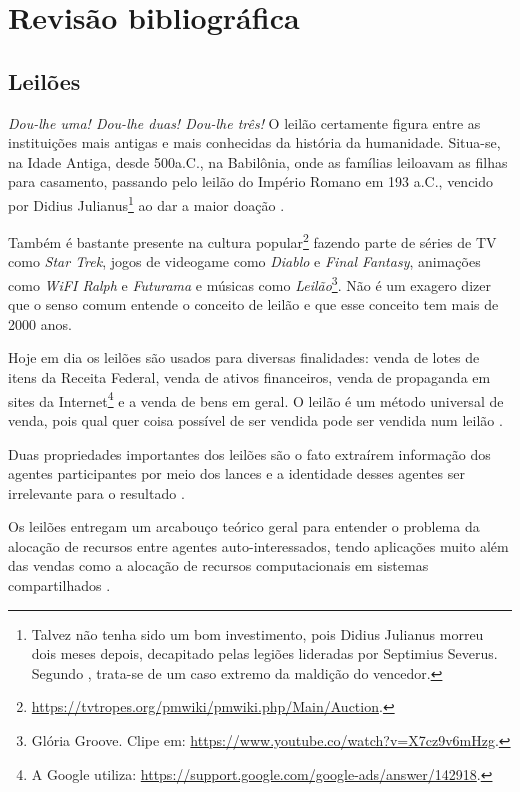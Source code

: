\chapter{Revisão bibliográfica}
\label{cap:revisao}

\section{Leilões}

\emph{Dou-lhe uma! Dou-lhe duas! Dou-lhe três!} O leilão certamente figura entre as instituições mais antigas e mais conhecidas da história da humanidade. Situa-se, na Idade Antiga, desde 500a.C., na Babilônia, onde as famílias leiloavam as filhas para casamento, passando pelo leilão do Império Romano em 193 a.C., vencido por Didius Julianus\footnote{Talvez não tenha sido um bom investimento, pois Didius Julianus morreu dois meses depois, decapitado pelas legiões lideradas por Septimius Severus. Segundo \citet{krishna}, trata-se de um caso extremo da maldição do vencedor.} ao dar a maior doação \citet{Cassady2021-ac}.

Também é bastante presente na cultura popular\footnote{\url{https://tvtropes.org/pmwiki/pmwiki.php/Main/Auction}.} fazendo parte de séries de TV como \emph{Star Trek}, jogos de videogame como \emph{Diablo} e \emph{Final Fantasy}, animações como \emph{WiFI Ralph} e \emph{Futurama} e músicas como \emph{Leilão}\footnote{Glória Groove. Clipe em: \url{https://www.youtube.co/watch?v=X7cz9v6mHzg}.}. Não é um exagero dizer que o senso comum entende o conceito de leilão e que esse conceito tem mais de 2000 anos.

Hoje em dia os leilões são usados para diversas finalidades: venda de lotes de itens da Receita Federal, venda de ativos financeiros, venda de propaganda em sites da Internet\footnote{A Google utiliza: \url{https://support.google.com/google-ads/answer/142918}.} e a venda de bens em geral. O leilão é um método universal de venda, pois qual quer coisa possível de ser vendida pode ser vendida num leilão \citet{krishna}.

Duas propriedades importantes dos leilões são o fato extraírem informação dos agentes participantes por meio dos lances e a identidade desses agentes ser irrelevante para o resultado \citet{krishna}.

Os leilões entregam um arcabouço teórico geral para entender o problema da alocação de recursos entre agentes auto-interessados, tendo aplicações muito além das vendas como a alocação de recursos computacionais em sistemas compartilhados \citet{Shoham2008}.

